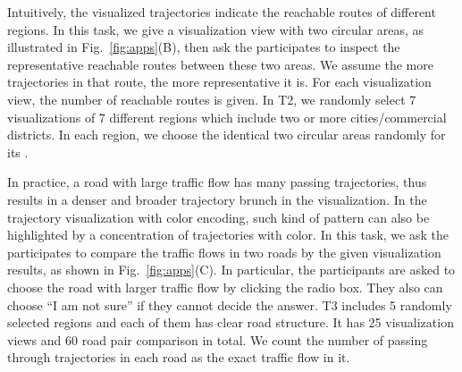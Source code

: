 Intuitively, the visualized trajectories indicate the reachable routes of different regions.
In this task, we give a visualization view with two circular areas, as illustrated in Fig.~\ref{fig:apps}(B),
then ask the participates to inspect the representative reachable routes between these two areas.
We assume the more trajectories in that route, the more representative it is.
For each visualization view, the number of reachable routes is given.
In T2, we randomly select 7 visualizations of 7 different regions which include two or more cities/commercial districts.
In each region, we choose the identical two circular areas randomly for its .


In practice, a road with large traffic flow has many passing trajectories, thus results in a denser and broader trajectory brunch in the visualization.
In the trajectory visualization with color encoding, such kind of pattern can also be highlighted by a concentration of trajectories with  color.
In this task, we ask the participates to compare the traffic flows in two roads by the given visualization results, as shown in Fig.~\ref{fig:apps}(C).
In particular, the participants are asked to choose the road with larger traffic flow by clicking the radio box.
They also can choose ``I am not sure'' if they cannot decide the answer.
T3 includes 5 randomly selected regions and each of them has clear road structure.
It has 25 visualization views and 60 road pair comparison in total.
We count the number of passing through trajectories in each road as the exact traffic flow in it.




